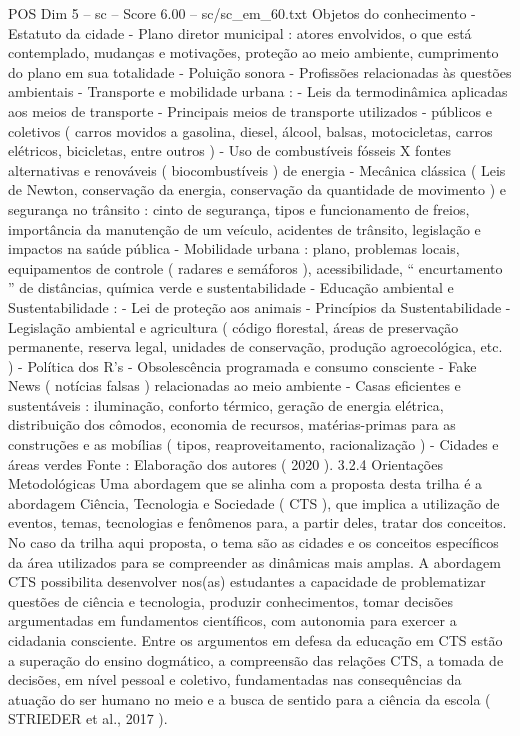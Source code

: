 \begin{textsample}{POS Dim 5 – sc – Score 6.00 – sc/sc\_em\_60.txt}
Objetos do conhecimento - Estatuto da cidade - Plano diretor municipal : atores envolvidos, o que está contemplado, mudanças e motivações, proteção ao meio ambiente, cumprimento do plano em sua totalidade - Poluição sonora - Profissões relacionadas às questões ambientais - Transporte e mobilidade urbana : - Leis da termodinâmica aplicadas aos meios de transporte - Principais meios de transporte utilizados - públicos e coletivos ( carros movidos a gasolina, diesel, álcool, balsas, motocicletas, carros elétricos, bicicletas, entre outros ) - Uso de combustíveis fósseis X fontes alternativas e renováveis ( biocombustíveis ) de energia - Mecânica clássica ( Leis de Newton, conservação da energia, conservação da quantidade de movimento ) e segurança no trânsito : cinto de segurança, tipos e funcionamento de freios, importância da manutenção de um veículo, acidentes de trânsito, legislação e impactos na saúde pública - Mobilidade urbana : plano, problemas locais, equipamentos de controle ( radares e semáforos ), acessibilidade, “ encurtamento ” de distâncias, química verde e sustentabilidade - Educação ambiental e Sustentabilidade : - Lei de proteção aos animais - Princípios da Sustentabilidade - Legislação ambiental e agricultura ( código florestal, áreas de preservação permanente, reserva legal, unidades de conservação, produção agroecológica, etc. ) - Política dos R’s - Obsolescência programada e consumo consciente - Fake News ( notícias falsas ) relacionadas ao meio ambiente - Casas eficientes e sustentáveis : iluminação, conforto térmico, geração de energia elétrica, distribuição dos cômodos, economia de recursos, matérias-primas para as construções e as mobílias ( tipos, reaproveitamento, racionalização ) - Cidades e áreas verdes Fonte : Elaboração dos autores ( 2020 ). 3.2.4 Orientações Metodológicas Uma abordagem que se alinha com a proposta desta trilha é a abordagem Ciência, Tecnologia e Sociedade ( CTS ), que implica a utilização de eventos, temas, tecnologias e fenômenos para, a partir deles, tratar dos conceitos.
No caso da trilha aqui proposta, o tema são as cidades e os conceitos específicos da área utilizados para se compreender as dinâmicas mais amplas.
A abordagem CTS possibilita desenvolver nos(as) estudantes a capacidade de problematizar questões de ciência e tecnologia, produzir conhecimentos, tomar decisões argumentadas em fundamentos científicos, com autonomia para exercer a cidadania consciente.
Entre os argumentos em defesa da educação em CTS estão a superação do ensino dogmático, a compreensão das relações CTS, a tomada de decisões, em nível pessoal e coletivo, fundamentadas nas consequências da atuação do ser humano no meio e a busca de sentido para a ciência da escola ( STRIEDER et al., 2017 ).

\end{textsample}
